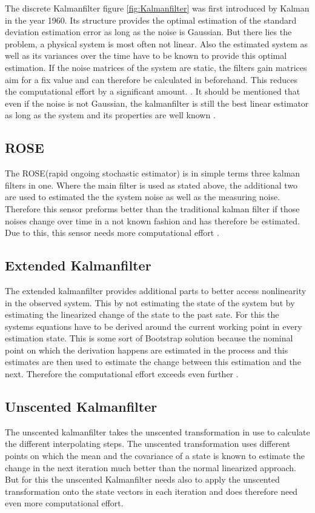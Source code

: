   The discrete Kalmanfilter figure \ref{fig:Kalmanfilter} was first introduced by Kalman in the year 1960.
  Its structure provides the optimal estimation of the standard deviation estimation error as long as the noise is Gaussian.
  But there lies the problem, a physical system is most often not linear.
  Also the estimated system as well as its variances over the time have to be known to provide this optimal estimation.
  If the noise matrices of the system are static, the filters gain matrices aim for a fix value and can therefore be calculated in beforehand.
  This reduces the computational effort by a significant amount. \cite{DavidWSchultz2004}.
  It should be mentioned that even if the noise is not Gaussian, the kalmanfilter is still the best
  linear estimator as long as the system and its properties are well known \cite{SimonDan2006Ose:}.
  
  \subsection{ROSE}
  The ROSE(rapid ongoing stochastic estimator) is in simple terms three kalman filters in one.
  Where the main filter is used as stated above, the additional two are used to estimated the 
  the system noise as well as the measuring noise. Therefore this sensor preforms better than the traditional kalman filter
  if those noises change over time in a not known fashion and has therefore be estimated.
  Due to this, this sensor needs more computational effort \cite{DavidWSchultz2004}. 
  
  \subsection{Extended Kalmanfilter}
  The extended kalmanfilter provides additional parts to better access nonlinearity in the observed system.
  This by not estimating the state of the system but by estimating the linearized change of the state 
  to the past sate. For this the systems equations have to be derived around the current working point in every estimation state.
  This is some sort of Bootstrap solution because the nominal point on which the derivation happens are estimated in the process and
  this estimates are then used to estimate the change between this estimation and the next.
  Therefore the computational effort exceeds even further \cite{SimonDan2006Ose:}.
  
  \subsection{Unscented Kalmanfilter}
  The unscented kalmanfilter takes the unscented transformation in use to calculate the different interpolating steps.
  The unscented transformation uses different points on which the mean and the covariance of a state is known to estimate the 
  change in the next iteration much better than the normal linearized approach.
  But for this the unscented Kalmanfilter needs also to apply the unscented transformation onto the state vectors in each iteration
  and does therefore need even more computational effort.
  
